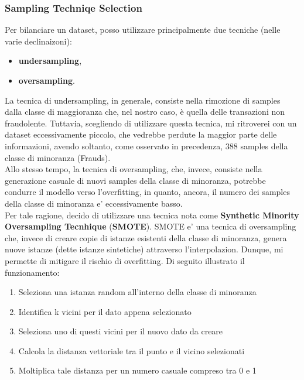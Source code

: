 \documentclass[]{article}
\begin{document}
        \subsubsection{Sampling Techniqe Selection}
            Per bilanciare un dataset, posso utilizzare principalmente due tecniche (nelle varie declinaizoni):
            \begin{itemize}
                \item \textbf{undersampling},
                \item \textbf{oversampling}.
            \end{itemize}
            La tecnica di undersampling, in generale, consiste nella rimozione di samples dalla classe di maggioranza che, nel nostro caso, è quella delle transazioni non fraudolente. Tuttavia, scegliendo di utilizzare questa tecnica, mi ritroverei con un dataset eccessivamente piccolo, che vedrebbe perdute la maggior parte delle informazioni, avendo soltanto, come osservato in precedenza, 388 samples della classe di minoranza (Frauds).\\
            Allo stesso tempo, la tecnica di oversampling, che, invece, consiste nella generazione casuale di nuovi samples della classe di minoranza, potrebbe condurre il modello verso l'overfitting, in quanto, ancora, il numero dei samples della classe di minoranza e' eccessivamente basso.\\
            Per tale ragione, decido di utilizzare una tecnica nota come \textbf{Synthetic Minority Oversampling Tecnhique} (\textbf{SMOTE}).
            SMOTE e' una tecnica di oversampling che, invece di creare copie di istanze esistenti della classe di minoranza, genera nuove istanze (dette istanze sintetiche) attraverso l'interpolazion. Dunque, mi permette di mitigare il rischio di overfitting. Di seguito illustrato il funzionamento:
            \begin{enumerate}
                \item Seleziona una istanza random all'interno della classe di minoranza
                \item Identifica k vicini per il dato appena selezionato
                \item Seleziona uno di questi vicini per il nuovo dato da creare
                \item Calcola la distanza vettoriale tra il punto e il vicino selezionati
                \item Moltiplica tale distanza per un numero casuale compreso tra 0 e 1
            \end{enumerate}
\end{document}
